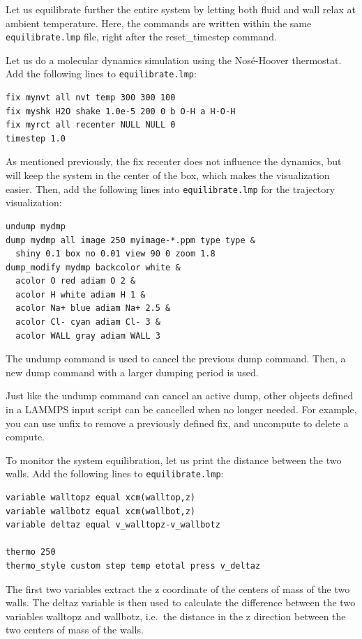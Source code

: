 \documentclass[9pt,tutorial]{livecoms}
\newcommand{\lmpcmd}[1]{\colorbox{listing}{\textcolor{command}{\small{#1}}}} %
\newcommand{\flecmd}[1]{\textcolor{command}{\texttt{#1}}} %
\begin{document}
Let us equilibrate further the entire system by letting both fluid and wall
relax at ambient temperature.  Here, the commands are written within the same
\flecmd{equilibrate.lmp} file, right after the \lmpcmd{reset\_timestep} command.

Let us do a molecular dynamics simulation using the Nosé-Hoover
thermostat.  Add the following lines to \flecmd{equilibrate.lmp}:
\begin{lstlisting}
fix mynvt all nvt temp 300 300 100
fix myshk H2O shake 1.0e-5 200 0 b O-H a H-O-H
fix myrct all recenter NULL NULL 0
timestep 1.0
\end{lstlisting}
As mentioned previously, the \lmpcmd{fix recenter} does not influence the dynamics,
but will keep the system in the center of the box, which makes the
visualization easier.  Then, add the following lines into \flecmd{equilibrate.lmp}
for the trajectory visualization:
\begin{lstlisting}
undump mydmp
dump mydmp all image 250 myimage-*.ppm type type &
  shiny 0.1 box no 0.01 view 90 0 zoom 1.8
dump_modify mydmp backcolor white &
  acolor O red adiam O 2 &
  acolor H white adiam H 1 &
  acolor Na+ blue adiam Na+ 2.5 &
  acolor Cl- cyan adiam Cl- 3 &
  acolor WALL gray adiam WALL 3
\end{lstlisting}
The \lmpcmd{undump} command is used to cancel the previous \lmpcmd{dump} command.
Then, a new \lmpcmd{dump} command with a larger dumping period is used.

\begin{note}
  Just like the \lmpcmd{undump} command can cancel an active \lmpcmd{dump}, other
  objects defined in a LAMMPS input script can be cancelled when no longer needed.
  For example, you can use \lmpcmd{unfix} to remove a previously defined \lmpcmd{fix}, and
  \lmpcmd{uncompute} to delete a \lmpcmd{compute}.
\end{note}

To monitor the system equilibration, let us print the distance between
the two walls.  Add the following lines to \flecmd{equilibrate.lmp}:
\begin{lstlisting}
variable walltopz equal xcm(walltop,z)
variable wallbotz equal xcm(wallbot,z)
variable deltaz equal v_walltopz-v_wallbotz

thermo 250
thermo_style custom step temp etotal press v_deltaz
\end{lstlisting}
The first two variables extract the z coordinate of the centers of mass of the two walls.  The
\lmpcmd{deltaz} variable is then used to calculate the difference between the two
variables \lmpcmd{walltopz} and \lmpcmd{wallbotz}, i.e.~the distance in the z direction between the
two centers of mass of the walls.
\end{document}
